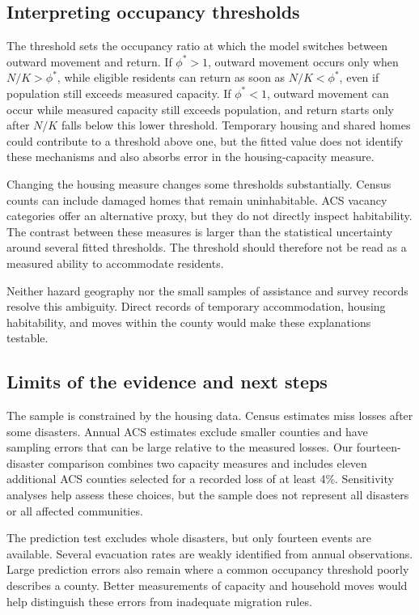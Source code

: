\documentclass[11pt]{article}
\begin{document}
\subsection*{Interpreting occupancy thresholds}The threshold sets the occupancy ratio at which the model switches between outward movement and return. If $\phi^*>1$, outward movement occurs only when $N/K>\phi^*$, while eligible residents can return as soon as $N/K<\phi^*$, even if population still exceeds measured capacity. If $\phi^*<1$, outward movement can occur while measured capacity still exceeds population, and return starts only after $N/K$ falls below this lower threshold. Temporary housing and shared homes could contribute to a threshold above one, but the fitted value does not identify these mechanisms and also absorbs error in the housing-capacity measure.

Changing the housing measure changes some thresholds substantially. Census counts can include damaged homes that remain uninhabitable. ACS vacancy categories offer an alternative proxy, but they do not directly inspect habitability. The contrast between these measures is larger than the statistical uncertainty around several fitted thresholds. The threshold should therefore not be read as a measured ability to accommodate residents.

Neither hazard geography nor the small samples of assistance and survey records resolve this ambiguity. Direct records of temporary accommodation, housing habitability, and moves within the county would make these explanations testable.

\subsection*{Limits of the evidence and next steps}

The sample is constrained by the housing data. Census estimates miss losses after some disasters. Annual ACS estimates exclude smaller counties and have sampling errors that can be large relative to the measured losses. Our fourteen-disaster comparison combines two capacity measures and includes eleven additional ACS counties selected for a recorded loss of at least 4\%. Sensitivity analyses help assess these choices, but the sample does not represent all disasters or all affected communities.

The prediction test excludes whole disasters, but only fourteen events are available. Several evacuation rates are weakly identified from annual observations. Large prediction errors also remain where a common occupancy threshold poorly describes a county. Better measurements of capacity and household moves would help distinguish these errors from inadequate migration rules.
\end{document}
